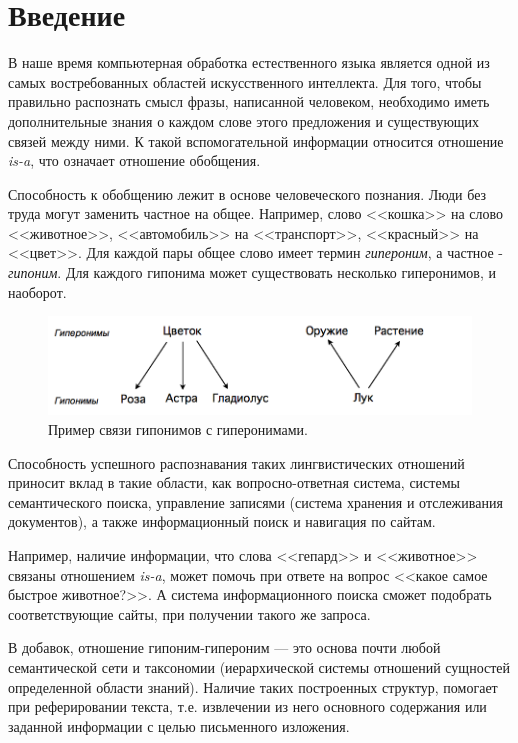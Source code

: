 \section*{Введение}
\label{sec:Introduction} 
\large 

В наше время компьютерная обработка естественного языка является одной из самых
востребованных областей искусственного интеллекта. Для того, чтобы правильно
распознать смысл фразы, написанной человеком, необходимо иметь дополнительные
знания о каждом слове этого предложения и существующих связей между ними. К такой
вспомогательной информации относится отношение \textit{is-a}, что означает отношение
обобщения.

Способность к обобщению лежит в основе человеческого познания. Люди без труда могут
заменить частное на общее. Например, слово <<кошка>> на слово <<животное>>,
<<автомобиль>> на <<транспорт>>, <<красный>> на <<цвет>>. Для каждой пары общее слово имеет
термин \textit{гипероним}, а частное - \textit{гипоним}. Для каждого гипонима может существовать
несколько гиперонимов, и наоборот.


\begin{figure}[ht]
\centering 
    \includegraphics[scale=0.6]{image/Example.png}
    \caption{Пример связи гипонимов с гиперонимами.}
    \label{srg}
\end{figure}



Способность успешного распознавания таких лингвистических отношений приносит вклад
в такие области, как вопросно-ответная система, системы семантического поиска,
управление записями (система хранения и отслеживания документов), а также
информационный поиск и навигация по сайтам.

Например, наличие информации, что слова <<гепард>> и <<животное>> связаны отношением
\textit{is-a}, может помочь при ответе на вопрос <<какое самое быстрое животное?>>. А система
информационного поиска сможет подобрать соответствующие сайты, при получении
такого же запроса.

В добавок, отношение гипоним-гипероним — это основа почти любой семантической сети и
таксономии (иерархической системы отношений сущностей определенной области
знаний). Наличие таких построенных структур, помогает при реферировании текста, т.е.
извлечении из него основного содержания или заданной информации с целью
письменного изложения.

